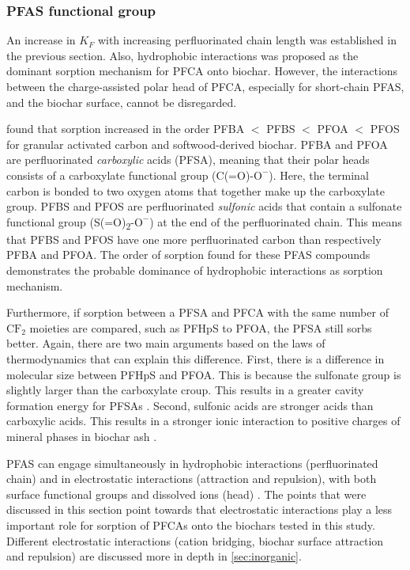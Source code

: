 \subsubsection{PFAS functional group} 
An increase in $K_F$ with increasing perfluorinated chain length was established in the previous section. Also, hydrophobic interactions was proposed as the dominant sorption mechanism for PFCA onto biochar. However, the interactions between the charge-assisted polar head of PFCA, especially for short-chain PFAS, and the biochar surface, cannot be disregarded. 

\cite{zhang2021sorption} found that sorption increased in the order PFBA $<$ PFBS $<$ PFOA $<$ PFOS for granular activated carbon and softwood-derived biochar. PFBA and PFOA are perfluorinated \textit{carboxylic} acids (\acrshort{PFSA}), meaning that their polar heads consists of a carboxylate functional group (C(=O)-$\mathrm{O^-}$). Here, the terminal carbon is bonded to two oxygen atoms that together make up the carboxylate group. PFBS and PFOS are perfluorinated \textit{sulfonic} acids that contain a sulfonate functional group (S(=O)\textsubscript{2}-$\mathrm{O^-}$) at the end of the perfluorinated chain. This means that PFBS and PFOS have one more perfluorinated carbon than respectively PFBA and PFOA. The order of sorption \cite{zhang2021sorption} found for these PFAS compounds demonstrates the probable dominance of hydrophobic interactions as sorption mechanism. 

Furthermore, if sorption between a PFSA and PFCA with the same number of $\mathrm{CF_2}$ moieties are compared, such as PFHpS to PFOA, the PFSA still sorbs better. Again, there are two main arguments based on the laws of thermodynamics that can explain this difference. First, there is a difference in molecular size between PFHpS and PFOA. This is because the sulfonate group is slightly larger than the carboxylate croup. This results in a greater cavity formation energy for PFSAs \citep{yin2022insights,sigmund2022sorption}. Second, sulfonic acids are stronger acids than carboxylic acids. This results in a stronger ionic interaction to positive charges of mineral phases in biochar ash \citep{arvaniti2015review}. 

PFAS can engage simultaneously in hydrophobic interactions (perfluorinated chain) and in electrostatic interactions (attraction and repulsion), with both surface functional groups and dissolved ions (head) \citep{zhang2013sorption,sigmund2022sorption}. The points that were discussed in this section point towards that electrostatic interactions play a less important role for sorption of PFCAs onto the biochars tested in this study. Different electrostatic interactions (cation bridging, biochar surface attraction and repulsion) are discussed more in depth in \cref{sec:inorganic}.


